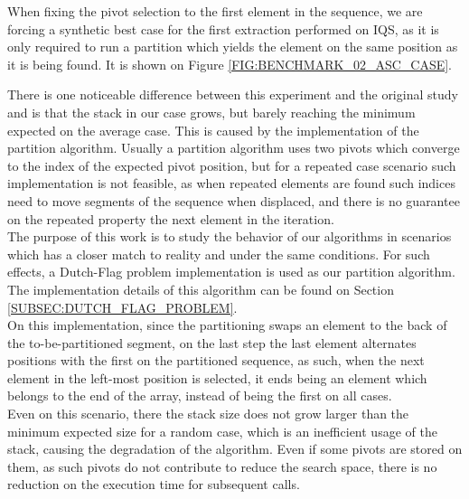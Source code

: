When fixing the pivot selection to the first element in the sequence, we are forcing a synthetic best case for the first extraction performed on IQS, as it is only required to run a partition which yields the element on the same position as it is being found. It is shown on Figure \ref{FIG:BENCHMARK_02_ASC_CASE}. 

There is one noticeable difference between this experiment and the original study and is that the stack in our case grows, but barely reaching the minimum expected on the average case. This is caused by the implementation of the partition algorithm. Usually a partition algorithm uses two pivots which converge to the index of the expected pivot position, but for a repeated case scenario such implementation is not feasible, as when repeated elements are found such indices need to move segments of the sequence when displaced, and there is no guarantee on the repeated property the next element in the iteration.\\

The purpose of this work is to study the behavior of our algorithms in scenarios which has a closer match to reality and under the same conditions. For such effects, a Dutch-Flag problem implementation is used as our partition algorithm. The implementation details of this algorithm can be found on Section \ref{SUBSEC:DUTCH_FLAG_PROBLEM}.\\

On this implementation, since the partitioning swaps an element to the back of the to-be-partitioned segment, on the last step the last element alternates positions with the first on the partitioned sequence, as such, when the next element in the left-most position is selected, it ends being an element which belongs to the end of the array, instead of being the first on all cases.\\

Even on this scenario, there the stack size does not grow larger than the minimum expected size for a random case, which is an inefficient usage of the stack, causing the degradation of the algorithm. Even if some pivots are stored on them, as such pivots do not contribute to reduce the search space, there is no reduction on the execution time for subsequent calls.\\


